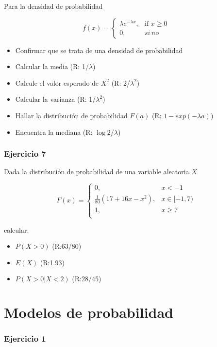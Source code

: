 \documentclass[
]{book}
\providecommand{\tightlist}{%
  \setlength{\itemsep}{0pt}\setlength{\parskip}{0pt}}
\begin{document}
Para la densidad de probabilidad

\[
    f(x)= 
\begin{cases}
    \lambda e^{-\lambda x},& \text{if } x \geq 0\\
    0,& si\,no 
\end{cases}
\]

\begin{itemize}
\tightlist
\item
  Confirmar que se trata de una densidad de probabilidad
\item
  Calcular la media (R: 1/\(\lambda\))
\item
  Calcule el valor esperado de \(X^2\) (R: 2/\(\lambda^2\))
\item
  Calcular la varianza (R: 1/\(\lambda^2\))
\item
  Hallar la distribución de probabilidad \(F(a)\) (R: \(1-exp(-\lambda a)\))
\item
  Encuentra la mediana (R: \(\log{2}\)/\(\lambda\))
\end{itemize}

\hypertarget{ejercicio-7}{%
\subsubsection{Ejercicio 7}\label{ejercicio-7}}

Dada la distribución de probabilidad de una variable aleatoria \(X\)

\[
    F(x)= 
\begin{cases}
0, & x  < -1 \\
\frac{1}{80}(17+16x-x^2),& x \in [-1,7)\\
1,& x \geq 7\\
\end{cases}
\]

calcular:

\begin{itemize}
\tightlist
\item
  \(P(X>0)\) (R:63/80)
\item
  \(E(X)\) (R:1.93)
\item
  \(P(X>0|X<2)\) (R:28/45)
\end{itemize}

\hypertarget{modelos-de-probabilidad}{%
\section{Modelos de probabilidad}\label{modelos-de-probabilidad}}

\hypertarget{ejercicio-1-4}{%
\subsubsection{Ejercicio 1}\label{ejercicio-1-4}}
\end{document}
